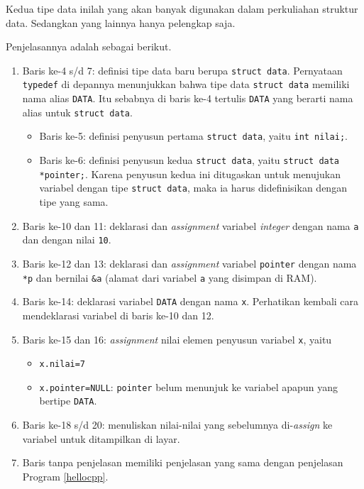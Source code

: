 Kedua tipe data inilah yang akan banyak digunakan dalam perkuliahan struktur data. Sedangkan yang lainnya hanya pelengkap saja.
\vfill
\scriptsize

\normalsize

Penjelasannya adalah sebagai berikut.
\begin{enumerate}
\item Baris ke-4 s/d 7: definisi tipe data baru berupa \texttt{struct data}. Pernyataan \texttt{typedef} di depannya menunjukkan bahwa tipe data \texttt{struct data} memiliki nama alias \texttt{DATA}. Itu sebabnya di baris ke-4 tertulis \texttt{DATA} yang berarti nama alias untuk \texttt{struct data}.
\begin{itemize}
\item Baris ke-5: definisi penyusun pertama \texttt{struct data}, yaitu \texttt{int nilai;}.
\item Baris ke-6: definisi penyusun kedua \texttt{struct data}, yaitu \texttt{struct data *pointer;}. Karena penyusun kedua ini ditugaskan untuk menujukan variabel dengan tipe \texttt{struct data}, maka ia harus didefinisikan dengan tipe yang sama.
\end{itemize}
\item Baris ke-10 dan 11: deklarasi dan \textit{assignment} variabel \textit{integer} dengan nama \texttt{a} dan dengan nilai \texttt{10}.
\item Baris ke-12 dan 13: deklarasi dan \textit{assignment} variabel \texttt{pointer} dengan nama \texttt{*p} dan bernilai \texttt{\&a} (alamat dari variabel \texttt{a} yang disimpan di RAM). 
\item Baris ke-14: deklarasi variabel \texttt{DATA} dengan nama \texttt{x}. Perhatikan kembali cara mendeklarasi variabel di baris ke-10 dan 12.
\item Baris ke-15 dan 16: \textit{assignment} nilai elemen penyusun variabel \texttt{x}, yaitu
\begin{itemize}
\item \texttt{x.nilai=7}
\item \texttt{x.pointer=NULL}: \texttt{pointer} belum menunjuk ke variabel apapun yang bertipe \texttt{DATA}.
\end{itemize}
\item Baris ke-18 s/d 20: menuliskan nilai-nilai yang sebelumnya di-\textit{assign} ke variabel untuk ditampilkan di layar.
\item Baris tanpa penjelasan memiliki penjelasan yang sama dengan penjelasan Program \ref{hellocpp}.
\end{enumerate}

